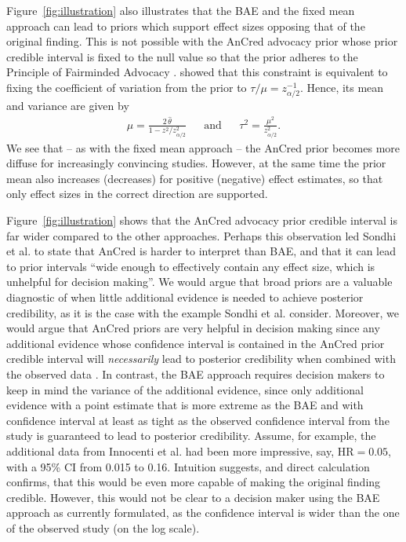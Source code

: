 Figure~\ref{fig:illustration} also illustrates that the BAE and the fixed mean
approach can lead to priors which support effect sizes opposing that of the
original finding. This is not possible with the AnCred advocacy prior whose
prior credible interval is fixed to the null value so that the prior adheres to
the Principle of Fairminded Advocacy \citep{Matthews2018}. \citet{Held2021b}
showed that this constraint is equivalent to fixing the coefficient of variation
from the prior to $\tau/\mu = z_{\scriptscriptstyle \alpha/2}^{-1}$. Hence, its
mean and variance are given by
\begin{align*}
  &\mu = \frac{2 \, \hat{\theta}}{1 - z^{2}/z_{\scriptscriptstyle \alpha/2}^{2}}&
  &\text{and}&
  &\tau^{2} = \frac{\mu^{2}}{z_{\scriptscriptstyle \alpha/2}^{2}}.&
\end{align*}
We see that -- as with the fixed mean approach -- the AnCred prior becomes more
diffuse for increasingly convincing studies. However, at the same time the prior
mean also increases (decreases) for positive (negative) effect estimates, so
that only effect sizes in the correct direction are supported.

Figure~\ref{fig:illustration} shows that the AnCred advocacy prior credible
interval is far wider compared to the other approaches. Perhaps this observation
led Sondhi et al. to state that AnCred is harder to interpret than BAE, and that
it can lead to prior intervals ``wide enough to effectively contain any effect
size, which is unhelpful for decision making''. We would argue that broad priors
are a valuable diagnostic of when little additional evidence is needed to
achieve posterior credibility, as it is the case with the example Sondhi et al.
consider. Moreover, we would argue that AnCred priors are very helpful in
decision making since any additional evidence whose confidence interval is
contained in the AnCred prior credible interval will \emph{necessarily} lead to
posterior credibility when combined with the observed data \citep{Held2021b}. In
contrast, the BAE approach requires decision makers to keep in mind the variance
of the additional evidence, since only additional evidence with a point estimate
that is more extreme as the BAE and with confidence interval at least as tight
as the observed confidence interval from the study is guaranteed to lead to
posterior credibility. Assume, for example, the additional data from Innocenti
et al. had been more impressive, say, $\mbox{HR} = 0.05$, with a 95\% CI from
0.015 to 0.16. Intuition suggests, and direct calculation confirms, that this
would be even more capable of making the original finding credible. However,
this would not be clear to a decision maker using the BAE approach as currently
formulated, as the confidence interval is wider than the one of the observed
study (on the log scale).

